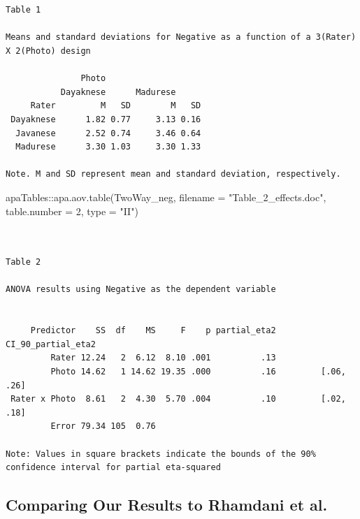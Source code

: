 \documentclass[
  11pt,
]{book}
\newenvironment{Shaded}{\begin{snugshade}}{\end{snugshade}}
\newcommand{\AttributeTok}[1]{\textcolor[rgb]{0.77,0.63,0.00}{#1}}
\newcommand{\DecValTok}[1]{\textcolor[rgb]{0.00,0.00,0.81}{#1}}
\newcommand{\FunctionTok}[1]{\textcolor[rgb]{0.00,0.00,0.00}{#1}}
\newcommand{\NormalTok}[1]{#1}
\newcommand{\SpecialCharTok}[1]{\textcolor[rgb]{0.00,0.00,0.00}{#1}}
\newcommand{\StringTok}[1]{\textcolor[rgb]{0.31,0.60,0.02}{#1}}
\begin{document}
\begin{verbatim}


Table 1 

Means and standard deviations for Negative as a function of a 3(Rater) X 2(Photo) design 

               Photo                   
           Dayaknese      Madurese     
     Rater         M   SD        M   SD
 Dayaknese      1.82 0.77     3.13 0.16
  Javanese      2.52 0.74     3.46 0.64
  Madurese      3.30 1.03     3.30 1.33

Note. M and SD represent mean and standard deviation, respectively. 
\end{verbatim}

\begin{Shaded}
\begin{Highlighting}[]
\NormalTok{apaTables}\SpecialCharTok{::}\FunctionTok{apa.aov.table}\NormalTok{(TwoWay\_neg, }\AttributeTok{filename =} \StringTok{"Table\_2\_effects.doc"}\NormalTok{,}
    \AttributeTok{table.number =} \DecValTok{2}\NormalTok{, }\AttributeTok{type =} \StringTok{"II"}\NormalTok{)}
\end{Highlighting}
\end{Shaded}

\begin{verbatim}


Table 2 

ANOVA results using Negative as the dependent variable
 

     Predictor    SS  df    MS     F    p partial_eta2 CI_90_partial_eta2
         Rater 12.24   2  6.12  8.10 .001          .13                   
         Photo 14.62   1 14.62 19.35 .000          .16         [.06, .26]
 Rater x Photo  8.61   2  4.30  5.70 .004          .10         [.02, .18]
         Error 79.34 105  0.76                                           

Note: Values in square brackets indicate the bounds of the 90% confidence interval for partial eta-squared 
\end{verbatim}

\hypertarget{comparing-our-results-to-rhamdani-et-al.--ramdhani_affective_2018}{%
\subsection{\texorpdfstring{Comparing Our Results to Rhamdani et al. \citeyearpar{ramdhani_affective_2018}}{Comparing Our Results to Rhamdani et al. {[}-@ramdhani\_affective\_2018{]}}}\label{comparing-our-results-to-rhamdani-et-al.--ramdhani_affective_2018}}
\end{document}
